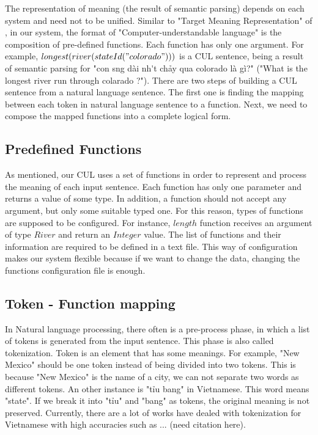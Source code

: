 \label{sec:c-u}

The representation of meaning (the result of semantic parsing) depends on each system and need not to be unified. Similar to "Target Meaning Representation" of \cite{Clarke:2010:DSP:1870568.1870571}, in our system, the format of "Computer-understandable language" is the composition of pre-defined functions. Each function has only one argument. For example, $longest(river(stateId("colorado")))$ is a CUL sentence, being a result of semantic parsing for
"{\selectfont con s\ocircumflex ng d\`ai nh\'\acircumflex t ch\h{a}y qua colorado l\`a g\`i?}" ("What is the longest river run through colarado ?"). There are two steps of building a CUL sentence from a natural language sentence. The first one is finding the mapping between each token in natural language sentence to a function. Next, we need to compose the mapped functions into a complete logical form.

\subsection{Predefined Functions}
As mentioned, our CUL uses a set of functions in order to represent and process the meaning of each input sentence. Each function has only one parameter and returns a value of some type. In addition, a function should not accept any argument, but only some suitable typed one. For this reason, types of functions are supposed to be configured. For instance, $length$ function receives an argument of type $River$ and return an $Integer$ value. The list of functions and their information are required to be defined in a text file. This way of configuration makes our system flexible because if we want to change the data, changing the functions configuration file is enough.

\subsection{Token - Function mapping}
In Natural language processing, there often is a pre-process phase, in which a list of tokens is generated from the input sentence. This phase is also called tokenization. Token is an element that has some meanings. For example, "New Mexico" should be one token instead of being divided into two tokens. This is because "New Mexico" is the name of a city, we can not separate two words as different tokens. An other instance is "{\selectfont ti\h\ecircumflex u bang}" in Vietnamese. This word means "state". If we break it into "{\selectfont ti\h\ecircumflex u}" and "bang" as tokens, the original meaning is not preserved. Currently, there are a lot of works have dealed with tokenization for Vietnamese with high accuracies such as ... (need citation here).


